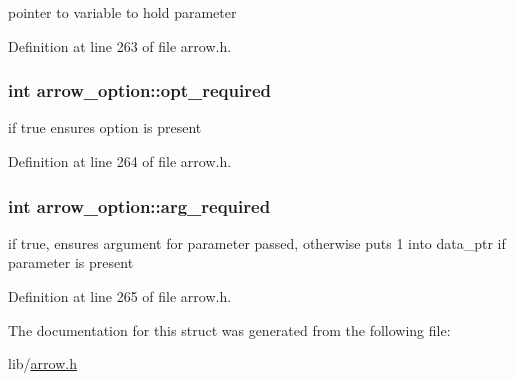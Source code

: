 pointer to variable to hold parameter 

Definition at line 263 of file arrow.h.\hypertarget{structarrow__option_2e7290d4b7088eab30df5f3bfc34ce93}{
\subsubsection{\setlength{\rightskip}{0pt plus 5cm}int {\bf arrow\_\-option::opt\_\-required}}}
\label{structarrow__option_2e7290d4b7088eab30df5f3bfc34ce93}


if true ensures option is present 

Definition at line 264 of file arrow.h.\hypertarget{structarrow__option_59aa495c8bd2e4d57014e4d9278020ed}{
\subsubsection{\setlength{\rightskip}{0pt plus 5cm}int {\bf arrow\_\-option::arg\_\-required}}}
\label{structarrow__option_59aa495c8bd2e4d57014e4d9278020ed}


if true, ensures argument for parameter passed, otherwise puts 1 into data\_\-ptr if parameter is present 

Definition at line 265 of file arrow.h.

The documentation for this struct was generated from the following file:\begin{CompactItemize}
\item 
lib/\hyperlink{arrow_8h}{arrow.h}\end{CompactItemize}
